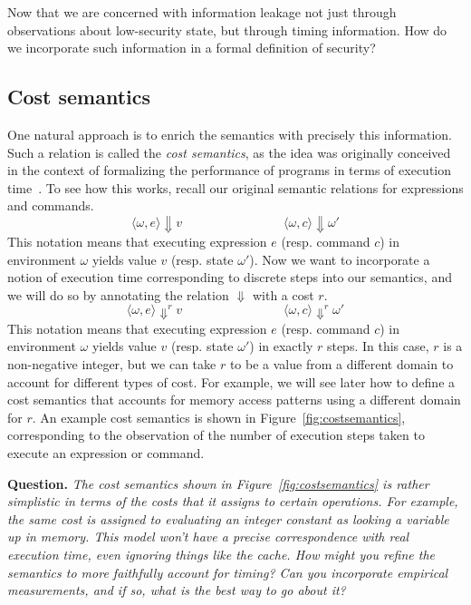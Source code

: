 \documentclass[11pt,twoside]{scrartcl}
\begin{document}
Now that we are concerned with information leakage not just through observations about low-security state, but through timing information. 
How do we incorporate such information in a formal definition of security?

\subsection{Cost semantics}
One natural approach is to enrich the semantics with precisely this information. Such a relation is called the \emph{cost semantics}, as the idea was originally conceived in the context of formalizing the performance of programs in terms of execution time~\cite{Hoffmann11}. To see how this works, recall our original semantic relations for expressions and commands.
\[
\langle \omega, e\rangle \Downarrow v
\quad\quad\quad\quad\quad\quad\quad\quad
\langle \omega, c\rangle \Downarrow \omega'
\]
This notation means that executing expression $e$ (resp. command $c$) in environment $\omega$ yields value $v$ (resp. state $\omega'$). Now we want to incorporate a notion of execution time corresponding to discrete steps into our semantics, and we will do so by annotating the relation $\Downarrow$ with a cost $r$.
\[
\langle \omega, e\rangle \Downarrow^r v
\quad\quad\quad\quad\quad\quad\quad\quad
\langle \omega, c\rangle \Downarrow^r \omega'
\]
This notation means that executing expression $e$ (resp. command $c$) in environment $\omega$ yields value $v$ (resp. state $\omega'$) in exactly $r$ steps. In this case, $r$ is a non-negative integer, but we can take $r$ to be a value from a different domain to account for different types of cost. For example, we will see later how to define a cost semantics that accounts for memory access patterns using a different domain for $r$.
An example cost semantics is shown in Figure~\ref{fig:costsemantics}, corresponding to the observation of the number of execution steps taken to execute an expression or command. 

\textbf{Question.} \emph{The cost semantics shown in Figure~\ref{fig:costsemantics} is rather simplistic in terms of the costs that it assigns to certain operations. For example, the same cost is assigned to evaluating an integer constant as looking a variable up in memory. This model won't have a precise correspondence with real execution time, even ignoring things like the cache. How might you refine the semantics to more faithfully account for timing? Can you incorporate empirical measurements, and if so, what is the best way to go about it?}
\end{document}
